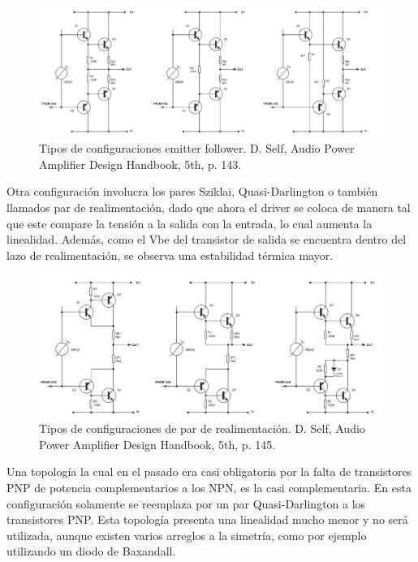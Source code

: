 \begin{figure}[H]
\centering
	\includegraphics[width=\textwidth]{ImagenesOutput-Stage/pag143-EF.png}
	\caption{Tipos de configuraciones emitter follower. D. Self, Audio Power Amplifier Design Handbook, 5th, p. 143.}
	\label{fig:ef}
\end{figure}


Otra configuración involucra los pares Sziklai, Quasi-Darlington o también llamados par de realimentación, dado que ahora el driver se coloca de manera tal que este compare la tensión a la salida con la entrada, lo cual aumenta la linealidad. Además, como el Vbe del transistor de salida se encuentra dentro del lazo de realimentación, se observa una estabilidad térmica mayor.

\begin{figure}[H]
\centering
	\includegraphics[width=\textwidth]{ImagenesOutput-Stage/pag145-CFP.png}
	\caption{Tipos de configuraciones de par de realimentación. D. Self, Audio Power Amplifier Design Handbook, 5th, p. 145.}
	\label{fig:cfp}
\end{figure}

Una topología la cual en el pasado era casi obligatoria por la falta de transistores PNP de potencia complementarios a los NPN, es la casi complementaria. En esta configuración solamente se reemplaza por un par Quasi-Darlington a los transistores PNP. Esta topología presenta una linealidad mucho menor y no será utilizada, aunque existen varios arreglos a la simetría, como por ejemplo utilizando un diodo de Baxandall.

